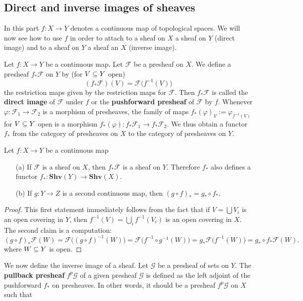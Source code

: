 \subsection{Direct and inverse images of sheaves}
In this part $f:X\to Y$ denotes a continuous map of topological spaces. We will now see how to use $f$ in order to attach to a sheaf on $X$ a sheaf on $Y$ (direct image) and to a sheaf on $Y$ a sheaf an $X$ (inverse image).
\begin{definition}
Let $f:X\to Y$ be a continuous map. Let $\mathscr{F}$ be a presheaf on $X$. We define a presheaf $f_*\mathscr{F}$ on $Y$ by (for $V\subseteq Y$ open)
\[(f_*\mathscr{F})(V)=\mathscr{F}\big(f^{-1}(V)\big)\]
the restriction maps given by the restriction maps for $\mathscr{F}$. Then $f_*\mathscr{F}$ is called the \textbf{direct image} of $\mathscr{F}$ under $f$ or the \textbf{pushforward presheaf} of $\mathscr{F}$ by $f$. Whenever $\varphi:\mathscr{F}_1\to\mathscr{F}_2$ is a morphism of presheaves, the family of maps $f_*(\varphi)_V:=\varphi_{f^{-1}(V)}$ for $V\subseteq Y$ open is a morphism $f_*(\varphi):f_*\mathscr{F}_1\to f_*\mathscr{F}_2$. We thus obtain a functor $f_*$ from the category of presheaves on $X$ to the category of presheaves on $Y$.
\end{definition}
\begin{proposition}\label{sheaf direct image prop}
Let $f:X\to Y$ be a continuous map
\begin{itemize}
\item[(a)] If $\mathscr{F}$ is a sheaf on $X$, then $f_*\mathscr{F}$ is a sheaf on $Y$. Therefore $f_*$ also defines a functor $f_*:\mathbf{Shv}(Y)\to\mathbf{Shv}(X)$.
\item[(b)] If $g:Y\to Z$ is a second continuous map, then $(g\circ f)_*=g_*\circ f_*$.
\end{itemize}
\end{proposition}
\begin{proof}
This first statement immediately follows from the fact that if $V=\bigcup V_i$ is an open covering in $Y$, then $f^{-1}(V)=\bigcup_if^{-1}(V_i)$ is an open covering in $X$. The second claim is a computation:
\[(g\circ f)_*\mathscr{F}(W)=\mathscr{F}\big((g\circ f)^{-1}(W)\big)=\mathscr{F}\big(f^{-1}\circ g^{-1}(W)\big)=g_*\mathscr{F}\big(f^{-1}(W)\big)=g_*\circ f_*\mathscr{F}(W).\]
where $W\subseteq Y$ is open.
\end{proof}
We now define the inverse image of a sheaf. Let $\mathscr{G}$ be a presheaf of sets on $Y$. The \textbf{pullback presheaf} $f^{p}\mathscr{G}$ of a given presheaf $\mathscr{G}$ is defined as the left adjoint of the pushforward $f_*$ on presheaves. In other words, it should be a presheaf $f^{p}\mathscr{G}$ on $X$ such that
